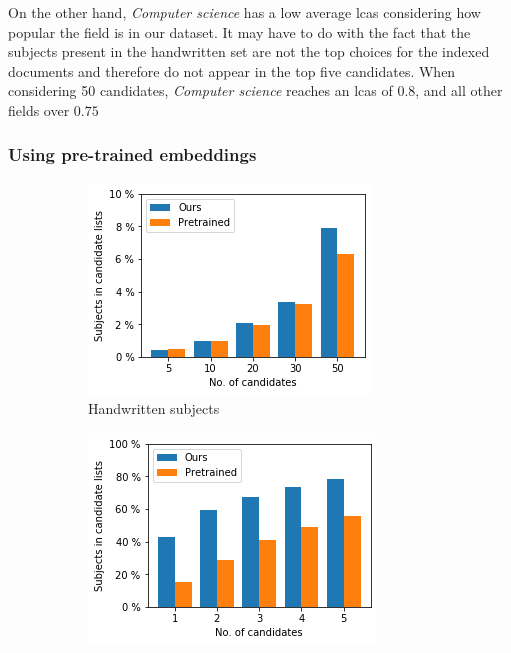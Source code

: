 On the other hand, \textit{Computer science} has a low average \acrshort{lcas} considering how popular the field is in our dataset. It may have to do with the fact that the subjects present in the handwritten set are not the top choices for the indexed documents and therefore do not appear in the top five candidates. When considering 50 candidates, \textit{Computer science} reaches an \acrshort{lcas} of $0.8$, and all other fields over $0.75$

\subsubsection{Using pre-trained embeddings} \label{unsupervised_approach_results_pretrained}

\begin{figure}
  \begin{subfigure}[t]{.32\textwidth}
    \centering
    \includegraphics[width=\textwidth]{figures/unsupervised_approach/results/pretrained_hw.png}
    \caption{Handwritten subjects}
    \label{fig:pretrained_hw}
  \end{subfigure}
  \begin{subfigure}[t]{.32\textwidth}
    \centering
    \includegraphics[width=\textwidth]{figures/unsupervised_approach/results/pretrained_ddc.png}

\end{subfigure}
\end{figure}
